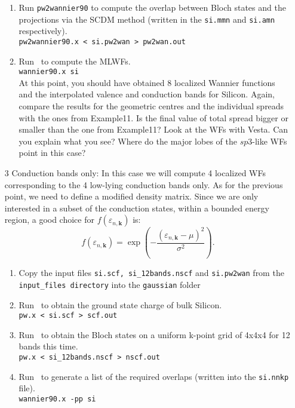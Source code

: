 \documentclass[a4paper,11pt,twoside]{article}
\begin{document}
\begin{itemize}
\begin{enumerate}
    \item Run {\tt pw2wannier90} to compute the overlap between Bloch
    states and the projections via the SCDM method (written in the
    {\tt si.mmn} and {\tt si.amn} respectively).\\  
    {\tt pw2wannier90.x < si.pw2wan > pw2wan.out}

    \item Run \wannier\ to compute the MLWFs.\\
    {\tt wannier90.x si}\\
    At this point, you should have obtained 8 localized Wannier functions and the interpolated valence and conduction bands for Silicon. Again, compare the results for the geometric centres and the individual spreads with the ones from Example11. Is the final value of total spread bigger or smaller than the one from Example11? Look at the WFs with Vesta. Can you explain what you see? Where do the major lobes of the $sp3$-like WFs point in this case?  
  \end{enumerate}
  \item[3]{Conduction bands only: In this case we will compute 4 localized WFs corresponding to the 4 low-lying conduction bands only. As for the previous point, we need to define a modified density matrix\cite{LinLin-ArXiv2017}. Since we are only interested in a subset of the conduction states, within a bounded energy region, a good choice for $f(\varepsilon_{n,\mathbf{k}})$ is: $$f(\varepsilon_{n,\mathbf{k}}) = \exp\left(-\frac{(\varepsilon_{n,\mathbf{k}} - \mu)^2}{\sigma^2}\right).$$}
    \begin{enumerate}
    \item Copy the input files {\tt si.scf, si\_12bands.nscf} and {\tt si.pw2wan} from the {\tt input\_files directory} into the {\tt gaussian} folder
    \item Run \pwscf\ to obtain the ground state charge of bulk Silicon. \\
    {\tt pw.x < si.scf > scf.out}

    \item Run \pwscf\ to obtain the Bloch states on a uniform k-point grid of 4x4x4 for 12 bands this time. \\
    {\tt pw.x < si\_12bands.nscf > nscf.out}
    
    \item Run \wannier\ to generate a list of the required overlaps (written
    into the {\tt si.nnkp} file).\\ 
    {\tt wannier90.x -pp si}


\end{enumerate}
\end{itemize}
\end{document}
